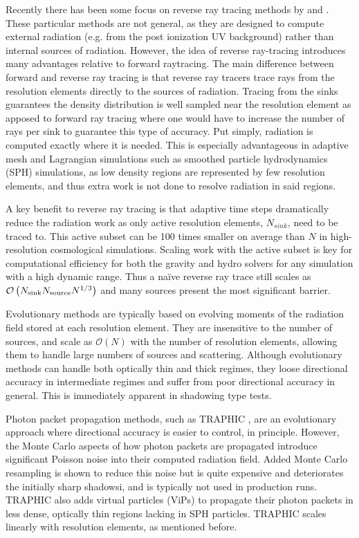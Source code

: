 \documentclass[fleq,usenatbib]{mnras}
\newcommand{\bigO}[1]{\mathcal{O}\left(#1\right)}
\newcommand{\NS}{N_{\rm source}}
\begin{document}
Recently there has been some focus on reverse ray tracing methods by
\cite{clarkEt12} and \cite{altayTheuns13}. These particular methods are not 
general, as they are designed to compute external radiation (e.g. from the 
post ionization UV background) rather than internal sources of radiation. 
However, the idea of reverse ray-tracing introduces many advantages relative 
to forward raytracing. The main difference between forward and reverse ray 
tracing is that reverse ray tracers trace rays from the resolution elements 
directly to the sources of radiation. Tracing from the sinks guarantees the 
density distribution is well sampled near the resolution element as apposed to 
forward ray tracing where one would have to increase the number of rays per 
sink to guarantee this type of accuracy. Put simply, radiation is computed 
exactly where it is needed.  This is especially advantageous in adaptive mesh 
and Lagrangian simulations such as smoothed particle hydrodynamics (SPH) 
simulations, as low density regions are represented by few resolution 
elements, and thus extra work is not done to resolve radiation in said regions.

A key benefit to reverse ray tracing is that adaptive time steps dramatically 
reduce the radiation work as only active resolution elements, $N_{sink}$, need 
to be traced to. This active subset can be 100 times smaller on average than 
$N$ in high-resolution cosmological simulations. Scaling work with the active 
subset is key for computational efficiency for both the gravity and hydro 
solvers for any simulation with a high dynamic range. Thus a na\"ive reverse 
ray trace still scales as $\bigO{N_{\rm sink} \NS N^{1/3}}$ and many sources 
present the most significant barrier.

Evolutionary methods are typically based on evolving moments of the radiation 
field stored at each resolution element. They are insensitive to the number of 
sources, and scale as $\mathcal{O}(N)$ with the number of resolution elements, 
allowing them to handle large numbers of sources and scattering. Although 
evolutionary methods can handle both optically thin and thick regimes, they 
loose directional accuracy in intermediate regimes and suffer from poor 
directional accuracy in general. This is immediately apparent in shadowing 
type tests.

Photon packet propagation methods, such as TRAPHIC \citep{pawlikSchaye08}, are 
an evolutionary approach where directional accuracy is easier to control, in 
principle. However, the Monte Carlo aspects of how photon packets are 
propagated introduce significant Poisson noise into their computed radiation 
field. Added Monte Carlo resampling is shown to reduce this noise but is quite 
expensive and deteriorates the initially sharp shadowsi, and is typically not 
used in production runs. TRAPHIC also adds virtual particles (ViPs) to 
propagate their photon packets in less dense, optically thin regions lacking 
in SPH particles. TRAPHIC scales linearly with resolution elements, as 
mentioned before.
\end{document}
